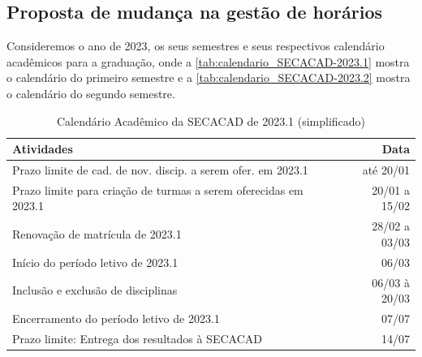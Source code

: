 \subsection{Proposta de mudança na gestão de horários} \label{ssec:aplicacaoDasMudancas} %



Consideremos o ano de 2023, os seus semestres e seus respectivos calendário acadêmicos \cite{Calendario2023_1,Calendario2023_2} para a graduação, onde a \autoref{tab:calendario_SECACAD-2023.1} mostra o calendário do primeiro semestre e a \autoref{tab:calendario_SECACAD-2023.2} mostra o calendário do segundo semestre.

\begin{table}[H] \centering \caption{Calendário Acadêmico da SECACAD de 2023.1 (simplificado)} \label{tab:calendario_SECACAD-2023.1}
  \begin{tabular}{| l r |}
    \hline
    \textbf{Atividades}                                              & \textbf{Data} \\
    \hline
    Prazo limite de cad. de nov. discip. a serem ofer. em 2023.1     & até 20/01     \\
    Prazo limite para criação de turmas a serem oferecidas em 2023.1 & 20/01 a 15/02 \\
    Renovação de matrícula de 2023.1                                 & 28/02 a 03/03 \\
    Início do período letivo de 2023.1                               & 06/03         \\
    Inclusão e exclusão de disciplinas                               & 06/03 à 20/03 \\
    Encerramento do período letivo de 2023.1                         & 07/07         \\
    Prazo limite: Entrega dos resultados à SECACAD                   & 14/07         \\
    \hline
  \end{tabular}
\end{table}


